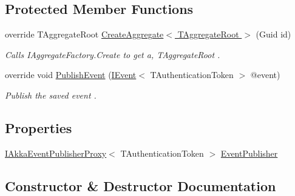 \subsection*{Protected Member Functions}
\begin{DoxyCompactItemize}
\item 
override T\+Aggregate\+Root \hyperlink{classCqrs_1_1Akka_1_1Domain_1_1AkkaAggregateRepository_a889a80595755372614382c36092f30dc_a889a80595755372614382c36092f30dc}{Create\+Aggregate$<$ T\+Aggregate\+Root $>$} (Guid id)
\begin{DoxyCompactList}\small\item\em Calls I\+Aggregate\+Factory.\+Create to get a, {\itshape T\+Aggregate\+Root} . \end{DoxyCompactList}\item 
override void \hyperlink{classCqrs_1_1Akka_1_1Domain_1_1AkkaAggregateRepository_a144cbfdedb23039729ba5b3058f84e7a_a144cbfdedb23039729ba5b3058f84e7a}{Publish\+Event} (\hyperlink{interfaceCqrs_1_1Events_1_1IEvent}{I\+Event}$<$ T\+Authentication\+Token $>$ @event)
\begin{DoxyCompactList}\small\item\em Publish the saved {\itshape event} . \end{DoxyCompactList}\end{DoxyCompactItemize}
\subsection*{Properties}
\begin{DoxyCompactItemize}
\item 
\hyperlink{interfaceCqrs_1_1Akka_1_1Events_1_1IAkkaEventPublisherProxy}{I\+Akka\+Event\+Publisher\+Proxy}$<$ T\+Authentication\+Token $>$ \hyperlink{classCqrs_1_1Akka_1_1Domain_1_1AkkaAggregateRepository_a6c6400aef33fd3ec5dc3e479ebec6b40_a6c6400aef33fd3ec5dc3e479ebec6b40}{Event\+Publisher}
\end{DoxyCompactItemize}


\subsection{Constructor \& Destructor Documentation}
\mbox{\label{classCqrs_1_1Akka_1_1Domain_1_1AkkaAggregateRepository_afc997ba5187ca08d3f81a0c204eda3a2_afc997ba5187ca08d3f81a0c204eda3a2}} 
